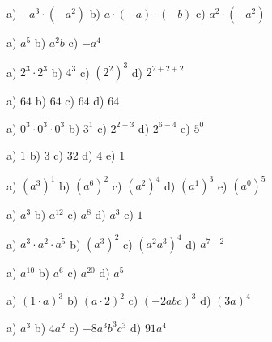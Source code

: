     \begin{tehtava}
        a) $-a^3\cdot(-a^2)$ \qquad
        b) $a\cdot(-a)\cdot(-b)$ \qquad
        c) $a^2\cdot(-a^2)$
        
        \begin{vastaus}
            a) $a^5$ \qquad
            b) $a^2b$ \qquad
            c) $-a^4$
        \end{vastaus}
    \end{tehtava}

    \begin{tehtava}
        a) $2^3\cdot2^3$ \qquad
        b) $4^3$ \qquad
        c) $(2^2)^3$ \qquad
        d) $2^{2+2+2}$

        \begin{vastaus}
            a) $64$ \qquad
            b) $64$ \qquad
            c) $64$ \qquad
            d) $64$
        \end{vastaus}
    \end{tehtava}

    \begin{tehtava}
        a) $0^3\cdot0^3\cdot0^3$ \qquad
        b) $3^1$ \qquad
        c) $2^{2+3}$ \qquad
        d) $2^{6-4}$ \qquad
        e) $5^0$

        \begin{vastaus}
            a) $1$ \qquad
            b) $3$ \qquad
            c) $32$ \qquad
            d) $4$ \qquad
            e) $1$
        \end{vastaus}
    \end{tehtava}
    \begin{tehtava}
        a) $(a^3)^1$ \qquad
        b) $(a^6)^2$ \qquad
        c) $(a^2)^4$ \qquad 
        d) $(a^1)^3$ \qquad
        e) $(a^0)^5$

        \begin{vastaus}
            a) $a^3$ \qquad
            b) $a^{12}$ \qquad
            c) $a^8$ \qquad
            d) $a^3$ \qquad
            e) $1$
        \end{vastaus}
    \end{tehtava}
    \begin{tehtava}
        a) $a^3\cdot a^2\cdot a^5$ \qquad
        b) $(a^3)^2$ \qquad
        c) $(a^2a^3)^4$ \qquad
        d) $a^{7-2}$

        \begin{vastaus}
            a) $a^{10}$ \qquad
            b) $a^6$ \qquad
            c) $a^{20}$ \qquad
            d) $a^5$
        \end{vastaus}
    \end{tehtava}
    \begin{tehtava}
        a) $(1\cdot a)^3$ \qquad
        b) $(a\cdot 2)^2$ \qquad
        c) $(-2abc)^3$ \qquad
        d) $(3a)^4$

        \begin{vastaus}
            a) $a^3$ \qquad
            b) $4a^2$ \qquad
            c) $-8a^3b^3c^3$ \qquad
            d) $91a^4$
        \end{vastaus}
    \end{tehtava}

